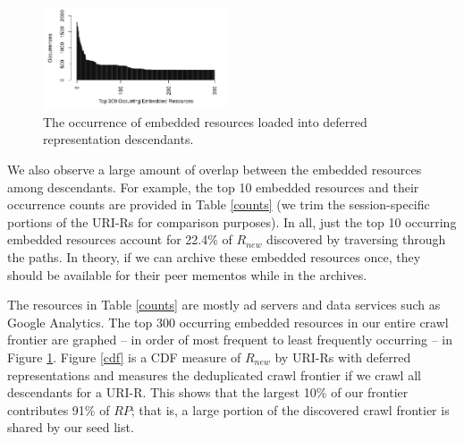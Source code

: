 \documentclass{sig-alternate}
\begin{document}




\begin{figure}
\centering
\includegraphics[width=0.48\textwidth]{./imgs/longTail.png}
\caption{The occurrence of embedded resources loaded into deferred representation descendants.}
\label{longtail}
\end{figure}

We also observe a large amount of overlap between the embedded resources among descendants. For example, the top 10 embedded resources and their occurrence counts are provided in Table \ref{counts} (we trim the session-specific portions of the URI-Rs for comparison purposes). In all, just the top 10 occurring embedded resources account for 22.4\% of $R_{new}$ discovered by traversing through the paths. In theory, if we can archive these embedded resources once, they should be available for their peer mementos while in the archives. 





The resources in Table \ref{counts} are mostly ad servers and data services such as Google Analytics. The top 300 occurring embedded resources in our entire crawl frontier are graphed -- in order of most frequent to least frequently occurring -- in Figure \ref{longtail}. Figure \ref{cdf} is a CDF measure of $R_{new}$ by URI-Rs with deferred representations and measures the deduplicated crawl frontier if we crawl all descendants for a URI-R. This shows that the largest 10\% of our frontier contributes 91\% of $RP$; that is, a large portion of the discovered crawl frontier is shared by our seed list.
\end{document}
